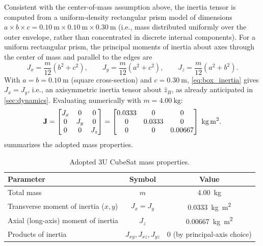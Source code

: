 Consistent with the center-of-mass assumption above, the inertia tensor is computed from a uniform-density rectangular prism model of dimensions $a\times b\times c = \SI{0.10}{\meter}\times\SI{0.10}{\meter}\times\SI{0.30}{\meter}$ (i.e., mass distributed uniformly over the outer envelope, rather than concentrated in discrete internal components). For a uniform rectangular prism, the principal moments of inertia about axes through the center of mass and parallel to the edges are \cite{hughes2004}
\begin{equation}
    J_x = \frac{m}{12}\left(b^2+c^2\right), \qquad
    J_y = \frac{m}{12}\left(a^2+c^2\right), \qquad
    J_z = \frac{m}{12}\left(a^2+b^2\right).
    \label{eq:box_inertia}
\end{equation}
With $a=b=\SI{0.10}{\meter}$ (square cross-section) and $c=\SI{0.30}{\meter}$, \cref{eq:box_inertia} gives $J_x = J_y$, i.e., an axisymmetric inertia tensor about $\hat z_B$, as already anticipated in \cref{sec:dynamics}. Evaluating numerically with $m=\SI{4.00}{\kilo\gram}$:
\begin{equation}
    \mathbf{J} =
    \begin{bmatrix}
        J_x & 0 & 0 \\ 0 & J_y & 0 \\ 0 & 0 & J_z
    \end{bmatrix}
    =
    \begin{bmatrix}
        0.0333 & 0 & 0 \\
        0 & 0.0333 & 0 \\
        0 & 0 & 0.00667
    \end{bmatrix}
    \; \si{\kilo\gram\meter\squared}.
    \label{eq:inertia_numeric}
\end{equation}
 summarizes the adopted mass properties.

\begin{table}[htbp]
\centering
\caption{Adopted 3U CubeSat mass properties.}
\label{tab:mass_props}
\begin{tabular}{@{}lcc@{}}
\toprule
Parameter & Symbol & Value \\
\midrule
Total mass & $m$ & \SI{4.00}{\kilo\gram} \\
Transverse moment of inertia ($x,y$) & $J_x = J_y$ & \SI{0.0333}{\kilo\gram\meter\squared} \\
Axial (long-axis) moment of inertia & $J_z$ & \SI{0.00667}{\kilo\gram\meter\squared} \\
Products of inertia & $J_{xy},J_{xz},J_{yz}$ & $0$ (by principal-axis choice) \\
\bottomrule
\end{tabular}
\end{table}

